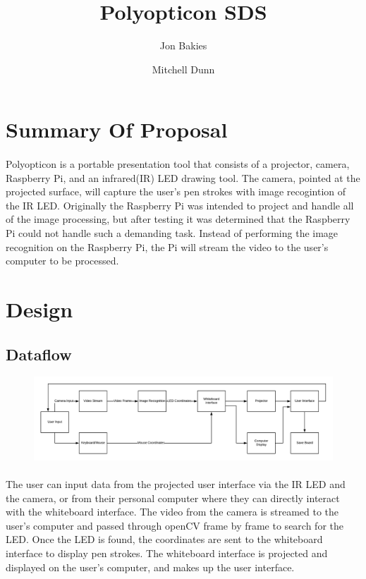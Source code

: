 \documentclass[12pt]{article}
\begin{document}
\title{Polyopticon SDS}
\author{Jon Bakies \and Mitchell Dunn} 

\maketitle
\newpage

\tableofcontents
\newpage

\section{Summary Of Proposal}
\paragraph{}
Polyopticon is a portable presentation tool that consists of a projector, camera, Raspberry Pi, and an infrared(IR) LED drawing tool.
The camera, pointed at the projected surface, will capture the user's pen strokes with image recogintion of the IR LED.
Originally the Raspberry Pi was intended to project and handle all of the image processing, but after testing it was determined that the Raspberry Pi could not handle such a demanding task.
Instead of performing the image recognition on the Raspberry Pi, the Pi will stream the video to the user's computer to be processed.

\section{Design}
\subsection{Dataflow}
\begin{figure}[ht!]
\centering
\includegraphics[width=\textwidth, height=\textheight, keepaspectratio]{Dataflow.png}
\end{figure}
\paragraph{}
The user can input data from the projected user interface via the IR LED and the camera, or from their personal computer where they can directly interact with the whiteboard interface.
The video from the camera is streamed to the user's computer and passed through openCV frame by frame to search for the LED.  
Once the LED is found, the coordinates are sent to the whiteboard interface to display pen strokes.
The whiteboard interface is projected and displayed on the user's computer, and makes up the user interface.
\end{document}
